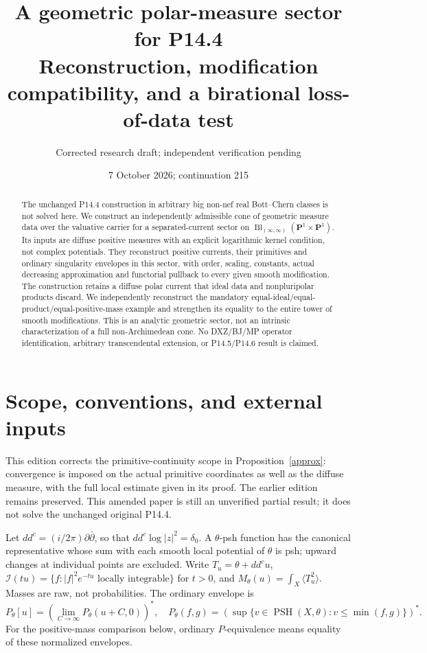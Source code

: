 \documentclass[11pt]{article}
\title{A geometric polar-measure sector for P14.4\\
\large Reconstruction, modification compatibility, and a birational loss-of-data test}
\author{Corrected research draft; independent verification pending}
\date{7 October 2026; continuation 215}
\theoremstyle{remark}\newtheorem{remark}[theorem]{Remark}
\newcommand{\ddc}{dd^c}
\newcommand{\PSH}{\operatorname{PSH}}
\newcommand{\cI}{\mathcal I}
\newcommand{\PP}{\mathbf P^1}
\begin{document}
\maketitle
\begin{abstract}
The unchanged P14.4 construction in arbitrary big non-nef real
Bott--Chern classes is not solved here. We construct an independently
admissible cone of geometric measure data over the valuative carrier
for a separated-current sector on
$\operatorname{Bl}_{(\infty,\infty)}(\PP\times\PP)$.
Its inputs are diffuse positive measures with an explicit logarithmic
kernel condition, not complex potentials. They reconstruct positive
currents, their primitives and ordinary singularity envelopes in this
sector, with order, scaling, constants, actual decreasing approximation
and functorial pullback to every given smooth modification.
The construction retains a diffuse polar current that ideal data and
nonpluripolar products discard. We independently reconstruct the
mandatory equal-ideal/equal-product/equal-positive-mass example and
strengthen its equality to the entire tower of smooth modifications.
This is an analytic geometric sector, not an intrinsic characterization
of a full non-Archimedean cone. No DXZ/BJ/MP operator identification,
arbitrary transcendental extension, or P14.5/P14.6 result is claimed.
\end{abstract}

\section{Scope, conventions, and external inputs}
This edition corrects the primitive-continuity scope in
Proposition~\ref{approx}: convergence is imposed on the actual
primitive coordinates as well as the diffuse measure, with the
full local estimate given in its proof. The earlier edition remains
preserved. This amended paper is still an unverified partial result;
it does not solve the unchanged original P14.4.

Let $\ddc=(i/2\pi)\partial\bar\partial$, so that
$\ddc\log|z|^2=\delta_0$. A $\theta$-psh function has the canonical
representative whose sum with each smooth local potential of $\theta$
is psh; upward changes at individual points are excluded. Write
$T_u=\theta+\ddc u$,
$\cI(tu)=\{f:|f|^2e^{-tu}\text{ locally integrable}\}$ for $t>0$,
and $M_\theta(u)=\int_X\langle T_u^2\rangle$.
Masses are raw, not probabilities.
The ordinary envelope is
\[
 P_\theta[u]=\left(\lim_{C\to\infty}P_\theta(u+C,0)\right)^*,
 \quad
 P_\theta(f,g)=
 \left(\sup\{v\in\PSH(X,\theta):v\leq\min(f,g)\}\right)^*.
 \tag{1.1}
\]
For the positive-mass comparison below, ordinary $P$-equivalence
means equality of these normalized envelopes.
\end{document}
